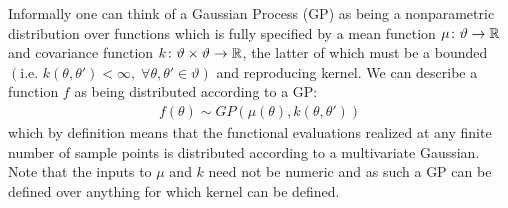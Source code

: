 Informally one can think of a Gaussian Process (GP) \citep{rasmussen2006gaussian} as being a nonparametric distribution over functions which is fully specified by a mean function $\mu \colon \vartheta \rightarrow \mathbb{R}$ and covariance function $k \colon \vartheta \times \vartheta \rightarrow \mathbb{R}$, the latter of which must be a bounded $\left(\text{i.e. }k\left(\theta,\theta'\right)<\infty, \; \forall \theta,\theta' \in \vartheta\right)$ and reproducing kernel.  We can describe a function $f$ as being distributed according to a GP:
\begin{align}
\label{eq:GP}
f \left(\theta\right) \sim GP \left(\mu\left(\theta\right), k\left(\theta,\theta'\right)\right)
\end{align}
which by definition means that the functional evaluations realized at any finite number of sample points is distributed according to a multivariate Gaussian. Note that the inputs to $\mu$ and $k$ need not be numeric and as such a GP can be defined over anything for which kernel can be defined.

